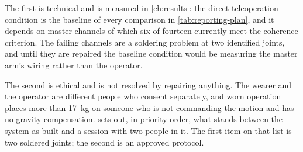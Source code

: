 The first is technical and is measured in \cref{ch:results}: the direct
teleoperation condition is the baseline of every comparison in
\cref{tab:reporting-plan}, and it depends on master channels of which six of
fourteen currently meet the coherence criterion. The failing channels are a
soldering problem at two identified joints, and until they are repaired the
baseline condition would be measuring the master arm's wiring rather than the
operator.

The second is ethical and is not resolved by repairing anything. The wearer
and the operator are different people who consent separately, and worn
operation places more than \SI{17}{\kilo\gram} on someone who is not
commanding the motion and has no gravity compensation. 
sets out, in priority order, what stands between the system as built and a
session with two people in it. The first item on that list is two soldered
joints; the second is an approved protocol.
